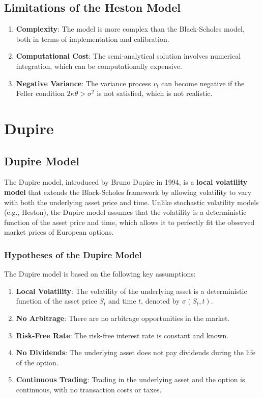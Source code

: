 \documentclass[11pt, oneside, a4paper, titlepage]{report}
\begin{document}
\subsection{Limitations of the Heston Model}

\begin{enumerate}
    \item \textbf{Complexity}: The model is more complex than the Black-Scholes model, both in terms of implementation and calibration.
    \item \textbf{Computational Cost}: The semi-analytical solution involves numerical integration, which can be computationally expensive.
    \item \textbf{Negative Variance}: The variance process \( v_t \) can become negative if the Feller condition \( 2 \kappa \theta > \sigma^2 \) is not satisfied, which is not realistic.
\end{enumerate}

\section{Dupire}
\subsection{Dupire Model}

The Dupire model, introduced by Bruno Dupire in 1994, is a \textbf{local volatility model} that extends the Black-Scholes framework by allowing volatility to vary with both the underlying asset price and time. Unlike stochastic volatility models (e.g., Heston), the Dupire model assumes that the volatility is a deterministic function of the asset price and time, which allows it to perfectly fit the observed market prices of European options.

\subsubsection{Hypotheses of the Dupire Model}

The Dupire model is based on the following key assumptions:
\begin{enumerate}
    \item \textbf{Local Volatility}: The volatility of the underlying asset is a deterministic function of the asset price \( S_t \) and time \( t \), denoted by \( \sigma(S_t, t) \).
    \item \textbf{No Arbitrage}: There are no arbitrage opportunities in the market.
    \item \textbf{Risk-Free Rate}: The risk-free interest rate is constant and known.
    \item \textbf{No Dividends}: The underlying asset does not pay dividends during the life of the option.
    \item \textbf{Continuous Trading}: Trading in the underlying asset and the option is continuous, with no transaction costs or taxes.
\end{enumerate}
\end{document}
